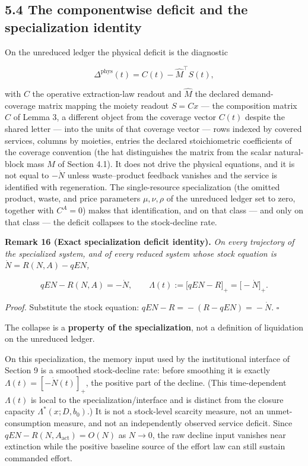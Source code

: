 \documentclass[11pt]{article}
\begin{document}
\subsection*{5.4 The componentwise deficit and the specialization identity}\label{54-the-componentwise-deficit-and-the-specialization-identity}

On the unreduced ledger the physical deficit is the diagnostic 

$$\Delta^{\mathrm{phys}}(t) = C(t) - \widehat{M}^\top S(t),$$

 with \(C\) the operative extraction-law readout and \(\widehat{M}\) the declared demand-coverage matrix mapping the moiety readout \(S = Cx\) --- the composition matrix \(C\) of Lemma 3, a different object from the coverage vector \(C(t)\) despite the shared letter --- into the units of that coverage vector --- rows indexed by covered services, columns by moieties, entries the declared stoichiometric coefficients of the coverage convention (the hat distinguishes the matrix from the scalar natural-block mass \(M\) of Section 4.1). It does not drive the physical equations, and it is not equal to \(-\dot N\) unless waste--product feedback vanishes and the service is identified with regeneration. The single-resource specialization (the omitted product, waste, and price parameters \(\mu, \nu, \rho\) of the unreduced ledger set to zero, together with \(C^A = 0\)) makes that identification, and on that class --- and only on that class --- the deficit collapses to the stock-decline rate.

\textbf{Remark 16 (Exact specialization deficit identity).} \emph{On every trajectory of the specialized system, and of every reduced system whose stock equation is \(\dot N = R(N,A) - qEN\),} 

$$qEN - R(N,A) = -\dot N, \qquad \Lambda(t) := \bigl[ qEN - R \bigr]_+ = \bigl[ -\dot N \bigr]_+.$$



\emph{Proof.} Substitute the stock equation: \(qEN - R =\allowbreak{} -(R - qEN) =\allowbreak{} -\dot N\). \(\square\)

The collapse is a \textbf{property of the specialization}, not a definition of liquidation on the unreduced ledger.

On this specialization, the memory input used by the institutional interface of Section 9 is a smoothed stock-decline rate: before smoothing it is exactly \(\Lambda(t)=[-\dot N(t)]_+\), the positive part of the decline. (This time-dependent \(\Lambda(t)\) is local to the specialization/interface and is distinct from the closure capacity \(\Lambda^*(x;D,b_0)\).) It is not a stock-level scarcity measure, not an unmet-consumption measure, and not an independently observed service deficit. Since \(qEN-R(N,A_{\mathrm{act}})=O(N)\) as \(N\to0\), the raw decline input vanishes near extinction while the positive baseline source of the effort law can still sustain commanded effort.
\end{document}
